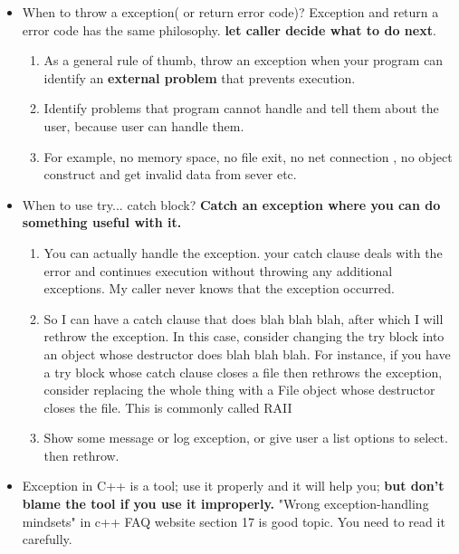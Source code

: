 \documentclass[a4paper,11pt,twoside]{book}
\begin{document}
\begin{itemize}
	\item When to throw a exception( or return error code)? Exception and return a error code has the same philosophy. \textbf{let caller decide what to do next}.
	\begin{enumerate}
		\item As a general rule of thumb, throw an exception when your program can identify an \textbf{external problem} that prevents execution.
		\item Identify problems that program cannot handle and tell them about the user, because user can handle them.
		\item For example, no memory space, no file exit, no net connection , no object construct and get invalid data from sever etc.
	\end{enumerate}
	
	\item When to use try... catch block? \textbf{Catch an exception where you can do something useful with it.}

	\begin{enumerate}
		\item You can actually handle the exception. your catch clause deals with the error and continues execution without throwing any additional exceptions. My caller never knows that the exception occurred.
		
		\item So I can have a catch clause that does blah blah blah, after which I will rethrow the exception. In this case, consider changing the try block into an object whose destructor does blah blah blah. For instance, if you have a try block whose catch clause closes a file then rethrows the exception, consider replacing the whole thing with a File object whose destructor closes the file. This is commonly called RAII
		
		\item Show some message or log exception, or give user a list options to select.  then rethrow.
	\end{enumerate}
		
	
	\item Exception in C++ is a tool; use it properly and it will help you; \textbf{but don't blame the tool if you use it improperly.} "Wrong exception-handling mindsets" in c++ FAQ website section 17 is good topic. You need to read it carefully.
	
\end{itemize}
\end{document}
